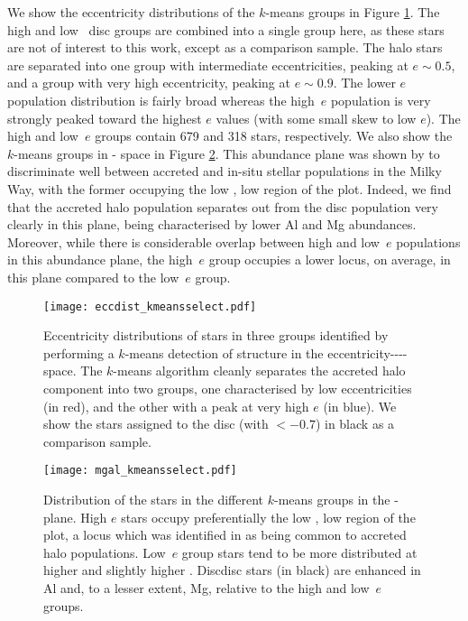 We show the eccentricity distributions of the $k$-means groups in
Figure \ref{fig:eccdist}. The high and low~\afe{} disc groups are
combined into a single group here, as these stars are not of interest
to this work, except as a comparison sample. The halo stars are
separated into one group with intermediate eccentricities, peaking
at $e \sim 0.5$, and a group with very high eccentricity, peaking
at $e \sim 0.9$. The lower $e$ population distribution is
fairly broad whereas the high~$e$ population is very strongly
peaked toward the highest $e$ values (with some small skew to low
$e$). The high and low~$e$ groups contain 679 and 318 stars,
respectively. We also show the $k$-means groups in \alfe{}-\mgfe{}
space in Figure \ref{fig:mgal}.  This abundance plane was shown by
\citet{2015MNRAS.453..758H} to discriminate well between accreted
and in-situ stellar populations in the Milky Way, with the former
occupying the low \alfe{}, low \mgfe{} region of the plot.
Indeed, we find that the accreted halo population separates out from the disc
population very clearly in this plane, being characterised by lower
Al and Mg abundances.  Moreover, while there is considerable overlap
between high and low~$e$ populations in this abundance plane, the
high~$e$ group occupies a lower \mgfe{} locus, on average, in this
plane compared to the low~$e$ group.


\begin{figure}
\texttt{[image: eccdist\_kmeansselect.pdf]}
\caption{\label{fig:eccdist} Eccentricity distributions of stars
in three groups identified by performing a $k$-means detection of
structure in the eccentricity-\feh{}-\mgfe{}-\alfe{}-\nife{} space.
The $k$-means algorithm cleanly separates the accreted halo component
into two groups, one characterised by low eccentricities (in red),
and the other with a peak at very high $e$ (in blue). We show the
stars assigned to the disc (with \feh{} $< -0.7$) in black as a
comparison sample. }
\end{figure}


\begin{figure}
\texttt{[image: mgal\_kmeansselect.pdf]}
\caption{\label{fig:mgal}  Distribution of the stars in the different
$k$-means groups in the \mgfe{}-\alfe{} plane.  High $e$ stars
occupy preferentially the low \alfe{}, low \mgfe{} region of the plot, a locus which was identified
in \citet{2015MNRAS.453..758H} as being common to accreted halo populations. Low~$e$ group stars
tend to be more distributed at higher \mgfe{} and slightly higher
\alfe{}. Discdisc stars (in black) are enhanced in Al and, to a lesser
extent, Mg, relative to the high and low~$e$ groups.}
\end{figure}



